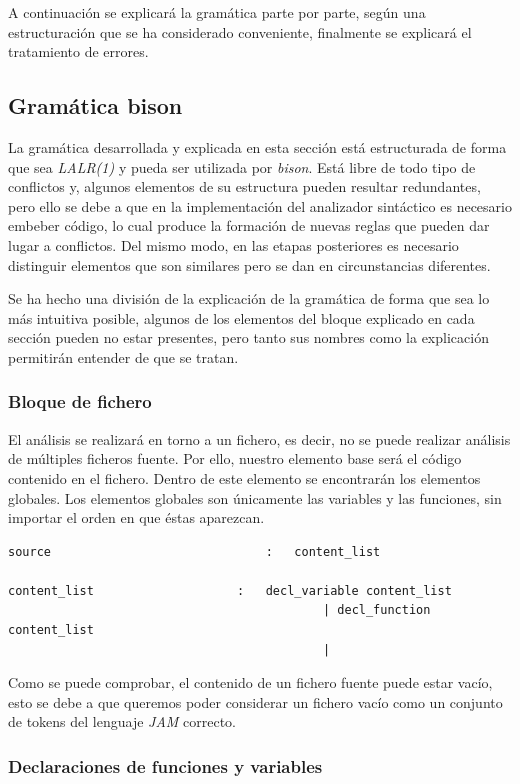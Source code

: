 \documentclass[a4paper,10pt]{article}
\begin{document}
A continuación se explicará la gramática parte por parte, según una estructuración que se ha considerado conveniente,  finalmente se explicará el tratamiento de errores.

\subsection{Gramática bison}
La gramática desarrollada y explicada en esta sección está estructurada de forma que sea \textit{LALR(1)} y pueda ser utilizada por \textit{bison}. Está libre de todo tipo de conflictos y, algunos elementos de su estructura pueden resultar redundantes, pero ello se debe a que en la implementación del analizador sintáctico es necesario embeber código, lo cual produce la formación de nuevas reglas que pueden dar lugar a conflictos. Del mismo modo, en las etapas posteriores es necesario distinguir elementos que son similares pero se dan en circunstancias diferentes.

Se ha hecho una división de la explicación de la gramática de forma que sea lo más intuitiva posible, algunos de los elementos del bloque explicado en cada sección pueden no estar presentes, pero tanto sus nombres como la explicación permitirán entender de que se tratan.

\subsubsection{Bloque de fichero}

El análisis se realizará en torno a un fichero, es decir, no se puede realizar análisis de múltiples ficheros fuente. Por ello, nuestro elemento base será el código contenido en el fichero. Dentro de este elemento se encontrarán los elementos globales. Los elementos globales son únicamente las variables y las funciones, sin importar el orden en que éstas aparezcan.
\begin{lstlisting}
source								:	content_list 
	
content_list					:	decl_variable content_list
											| decl_function content_list
											|	
\end{lstlisting}

Como se puede comprobar, el contenido de un fichero fuente puede estar vacío, esto se debe a que queremos poder considerar un fichero vacío como un conjunto de tokens del lenguaje \textit{JAM} correcto.

\subsubsection{Declaraciones de funciones y variables}
\end{document}
